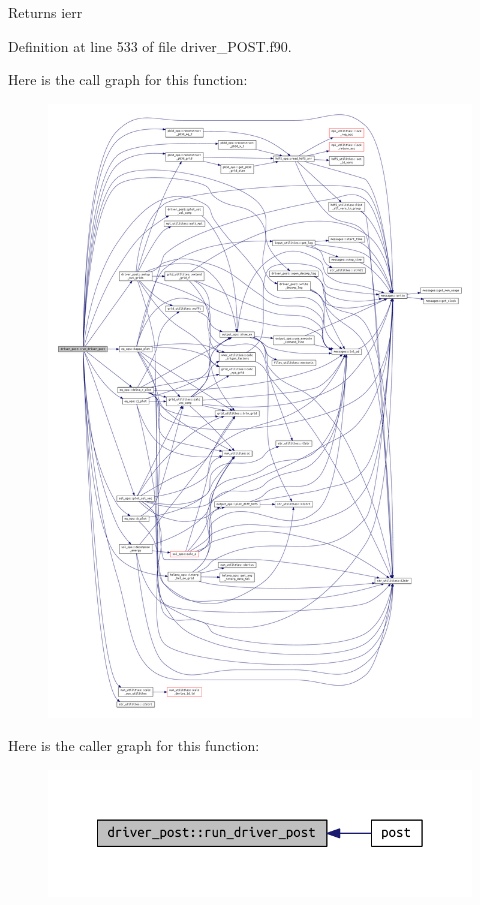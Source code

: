 \begin{DoxyReturn}{Returns}
ierr 
\end{DoxyReturn}


Definition at line 533 of file driver\+\_\+\+P\+O\+S\+T.\+f90.

Here is the call graph for this function\+:\nopagebreak
\begin{figure}[H]
\begin{center}
\leavevmode
\includegraphics[width=350pt]{namespacedriver__post_a33b3c6f9018a0ddc92dce77394b8ab37_cgraph}
\end{center}
\end{figure}
Here is the caller graph for this function\+:\nopagebreak
\begin{figure}[H]
\begin{center}
\leavevmode
\includegraphics[width=342pt]{namespacedriver__post_a33b3c6f9018a0ddc92dce77394b8ab37_icgraph}
\end{center}
\end{figure}
\mbox{\label{namespacedriver__post_a3438685c5fb7302f756c368fb5f940ee}} 
